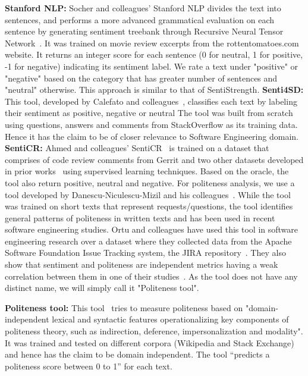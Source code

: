 \newline
\indent\textbf{Stanford NLP:} Socher and colleagues' Stanford NLP 
divides the text into sentences, 
and performs a more advanced grammatical evaluation 
on each sentence 
by generating sentiment treebank 
through Recursive Neural Tensor Network~\cite{socher2013recursive}.
It was trained on movie review excerpts 
from the rottentomatoes.com website. 
It returns an integer score for each sentence (0 for neutral, 1 for positive, -1 for negative) indicating its sentiment label. We rate a text under "positive" or "negative" based on the category that has greater number of sentences and "neutral" otherwise. This approach is similar to that of SentiStrength.
\newline
\indent\textbf{Senti4SD:} This tool, 
developed by Calefato and colleagues~\cite{calefato2017sentiment}, classifies each text by labeling their sentiment 
as positive, negative or neutral 
The tool was built
from scratch using 
questions, answers and comments 
from StackOverflow as its training data. 
Hence it has the claim to be of closer relevance to Software Engineering domain.
\newline
\indent \textbf{SentiCR:} Ahmed and colleagues' SentiCR~\cite{ahmed2017senticr} 
is trained on a dataset 
that comprises of 
code review comments from Gerrit and 
two other datasets developed 
in prior works~\cite{calefato2017sentiment,ortu2016emotional} using supervised learning techniques. 
Based on the oracle, 
the tool also return positive, neutral and negative.
\newline
\newline
For politeness analysis, we use a tool developed by Danescu-Nicu\-lescu-Mizil and his colleagues~\cite{danescu2013computational}. 
While the tool was trained on short texts 
that represent requests/questions, 
the tool identifies general patterns of politeness 
in written texts and 
has been used in recent software engineering studies.
Ortu and colleagues have used this tool in software engineering research over a dataset where they collected data from the Apache Software Foundation Issue Tracking system, the JIRA repository~\cite{ortu2015would,ortu2015bullies}. They also show that sentiment and politeness are independent metrics having a weak correlation between them in one of their studies~\cite{ortu2015bullies}. As the tool does not have any distinct name, we will simply call it "Politeness tool". 

\textbf{Politeness tool:} This tool~\cite{danescu2013computational} tries to measure politeness based on "domain-independent lexical and syntactic features operationalizing key components of politeness theory, such as indirection, deference, impersonalization and modality". 
It was trained and tested 
on different corpora (Wikipedia and Stack Exchange) 
and hence has the claim to be domain independent. 
The tool ``predicts a politeness score between 0 to 1'' 
for each text.   

